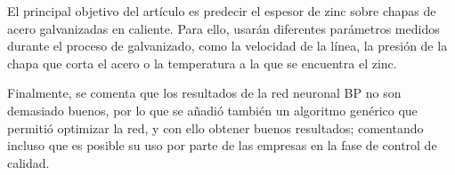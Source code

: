 El principal objetivo del artículo es predecir el espesor de zinc sobre chapas de acero galvanizadas en caliente. Para ello, usarán diferentes parámetros medidos durante el proceso de galvanizado, como la velocidad de la línea, la presión de la chapa que corta el acero o la temperatura a la que se encuentra el zinc.

Finalmente, se comenta que los resultados de la red neuronal BP no son demasiado buenos, por lo que se añadió también un algoritmo genérico que permitió optimizar la red, y con ello obtener buenos resultados; comentando incluso que es posible su uso por parte de las empresas en la fase de control de calidad.

